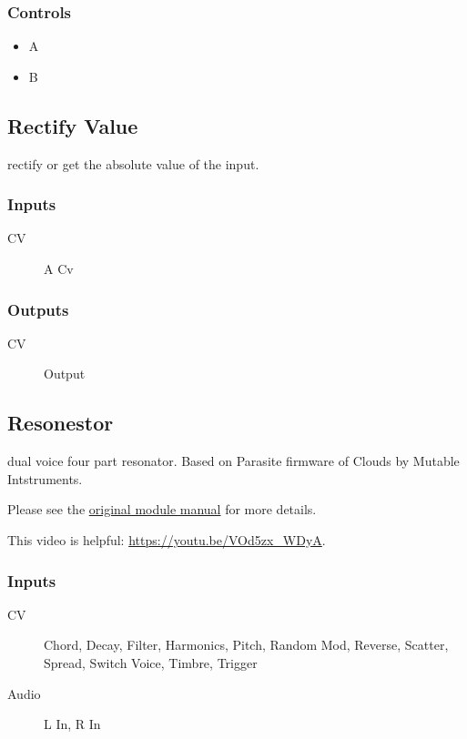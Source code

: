 \subsubsection{Controls}
\begin{itemize}
\item A
\item B
\end{itemize}

\subsection{Rectify Value}

rectify or get the absolute value of the input. 



\subsubsection{Inputs}
\begin{description}
\item [CV] A Cv
\end{description}

\subsubsection{Outputs}
\begin{description}
\item [CV] Output
\end{description}

\subsection{Resonestor}

dual voice four part resonator. Based on Parasite firmware of Clouds by Mutable Intstruments.



Please see the \href{https://mqtthiqs.github.io/parasites/clouds.html}{original module manual} for more details.

This video is helpful: \url{https://youtu.be/VOd5zx_WDyA}.

\subsubsection{Inputs}
\begin{description}
\item [CV] Chord, Decay, Filter, Harmonics, Pitch, Random Mod, Reverse, Scatter, Spread, Switch Voice, Timbre, Trigger
\item [Audio] L In, R In
\end{description}

